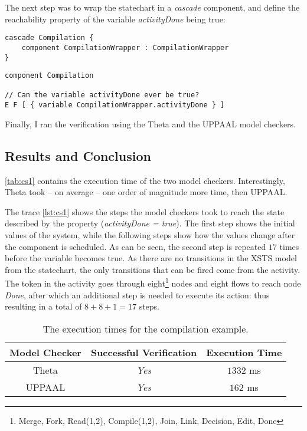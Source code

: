 The next step was to wrap the statechart in a \emph{cascade} component, and define the reachability property of the variable \emph{activityDone} being true:

\begin{lstlisting}[language=statechart, linewidth=0.80\textwidth, xleftmargin=0.20\textwidth]
cascade Compilation {
	component CompilationWrapper : CompilationWrapper
}
\end{lstlisting}

\begin{lstlisting}[language=statechart, linewidth=0.80\textwidth, xleftmargin=0.20\textwidth]
component Compilation

// Can the variable activityDone ever be true?
E F [ { variable CompilationWrapper.activityDone } ] 
\end{lstlisting}

Finally, I ran the verification using the Theta and the UPPAAL model checkers. 

\subsection{Results and Conclusion}

\autoref{tab:cs1} contains the execution time of the two model checkers. Interestingly, Theta took -- on average -- one order of magnitude more time, then UPPAAL.

The trace \autoref{lst:cs1} shows the steps the model checkers took to reach the state described by the property (\emph{activityDone = true}). The first step shows the initial values of the system, while the following steps show how the values change after the component is scheduled. As can be seen, the second step is repeated \(17\) times before the variable becomes true. As there are no transitions in the XSTS model from the statechart, the only transitions that can be fired come from the activity. The token in the activity goes through eight\footnote{Merge, Fork, Read(1,2), Compile(1,2), Join, Link, Decision, Edit, Done} nodes and eight flows to reach node \emph{Done}, after which an additional step is needed to execute its action: thus resulting in a total of \( 8 + 8 + 1 = 17 \) steps.

\begin{table}[!ht]
	\centering
	\begin{tabular}{|c|c|c|}
		\hline
		\textbf{Model Checker} & \textbf{Successful Verification} & \textbf{Execution Time} \\ \hline
		Theta                  & \emph{Yes}                              & \(1332\) ms                 \\ \hline
		UPPAAL                 & \emph{Yes}                              & \(162\) ms					\\ \hline
	\end{tabular}
	\caption{The execution times for the compilation example.}
	\label{tab:cs1}
\end{table}

